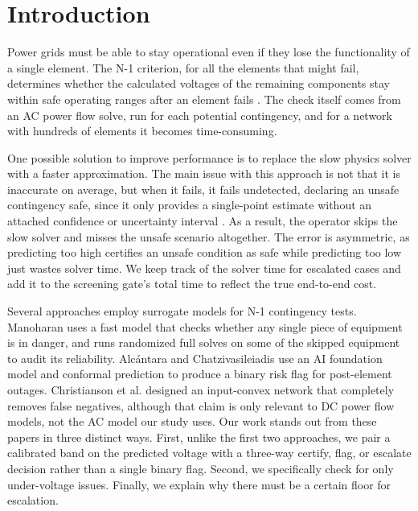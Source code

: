 \documentclass[conference]{IEEEtran}
\begin{document}
\section{Introduction}
Power grids must be able to stay operational even if they lose the functionality of a single element. The N-1 criterion, for all the elements that might fail, determines whether the calculated voltages of the remaining components stay within safe operating ranges after an element fails \cite{nerc}. The check itself comes from an AC power flow solve, run for each potential contingency, and for a network with hundreds of elements it becomes time-consuming.

One possible solution to improve performance is to replace the slow physics solver with a faster approximation. The main issue with this approach is not that it is inaccurate on average, but when it fails, it fails undetected, declaring an unsafe contingency safe, since it only provides a single-point estimate without an attached confidence or uncertainty interval \cite{bates2021}. As a result, the operator skips the slow solver and misses the unsafe scenario altogether. The error is asymmetric, as predicting too high certifies an unsafe condition as safe while predicting too low just wastes solver time. We keep track of the solver time for escalated cases and add it to the screening gate's total time to reflect the true end-to-end cost.

Several approaches employ surrogate models for N-1 contingency tests. Manoharan \cite{manoharan2026} uses a fast model that checks whether any single piece of equipment is in danger, and runs randomized full solves on some of the skipped equipment to audit its reliability. Alc\'antara and Chatzivasileiadis \cite{alcantara2026} use an AI foundation model and conformal prediction to produce a binary risk flag for post-element outages. Christianson et al. \cite{christianson2025} designed an input-convex network that completely removes false negatives, although that claim is only relevant to DC power flow models, not the AC model our study uses. Our work stands out from these papers in three distinct ways. First, unlike the first two approaches, we pair a calibrated band on the predicted voltage with a three-way certify, flag, or escalate decision rather than a single binary flag. Second, we specifically check for only under-voltage issues. Finally, we explain why there must be a certain floor for escalation.
\end{document}
